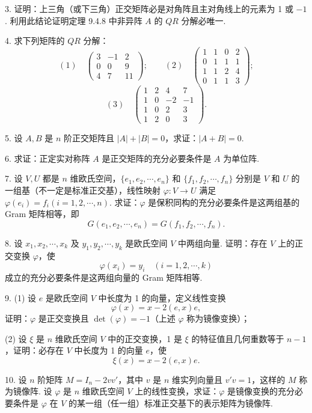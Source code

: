 \documentclass[UTF8, 12pt, fontset=fandol, oneside]{ctexart}
\begin{document}
3. 证明：上三角（或下三角）正交矩阵必是对角阵且主对角线上的元素为 1 或 $-1$. 利用此结论证明定理 9.4.8 中非异阵 $A$ 的 $QR$ 分解必唯一.

4. 求下列矩阵的 $QR$ 分解：
\[
  (1)\quad
  \left(\begin{array}{ccc}
    3 & -1 & 2\\
    0 & 0 & 9\\
    4 & 7 & 11
  \end{array}\right);
  \qquad
  (2)\quad
  \left(\begin{array}{cccc}
    1 & 1 & 0 & 2\\
    0 & 1 & 1 & 1\\
    1 & 1 & 2 & 4\\
    0 & 1 & 1 & 3
  \end{array}\right);
\]
\[
  (3)\quad
  \left(\begin{array}{cccc}
    1 & 2 & 4 & 7\\
    1 & 0 & -2 & -1\\
    1 & 0 & 2 & 3\\
    1 & 2 & 0 & 3
  \end{array}\right).
\]

5. 设 $A,B$ 是 $n$ 阶正交矩阵且 $|A|+|B|=0$，求证：$|A+B|=0$.

6. 求证：正定实对称阵 $A$ 是正交矩阵的充分必要条件是 $A$ 为单位阵.

7. 设 $V,U$ 都是 $n$ 维欧氏空间，$\{e_1,e_2,\cdots,e_n\}$ 和 $\{f_1,f_2,\cdots,f_n\}$ 分别是 $V$ 和 $U$ 的一组基（不一定是标准正交基），线性映射 $\varphi:V\to U$ 满足 $\varphi(e_i)=f_i(i=1,2,\cdots,n)$. 求证：$\varphi$ 是保积同构的充分必要条件是这两组基的 Gram 矩阵相等，即
\[
  G(e_1,e_2,\cdots,e_n)=G(f_1,f_2,\cdots,f_n).
\]

8. 设 $x_1,x_2,\cdots,x_k$ 及 $y_1,y_2,\cdots,y_k$ 是欧氏空间 $V$ 中两组向量. 证明：存在 $V$ 上的正交变换 $\varphi$，使
\[
  \varphi(x_i)=y_i\quad(i=1,2,\cdots,k)
\]
成立的充分必要条件是这两组向量的 Gram 矩阵相等.

9. (1) 设 $e$ 是欧氏空间 $V$ 中长度为 1 的向量，定义线性变换
\[
  \varphi(x)=x-2(e,x)e,
\]
证明：$\varphi$ 是正交变换且 $\det(\varphi)=-1$（上述 $\varphi$ 称为镜像变换）；

(2) 设 $\xi$ 是 $n$ 维欧氏空间 $V$ 中的正交变换，1 是 $\xi$ 的特征值且几何重数等于 $n-1$，证明：必存在 $V$ 中长度为 1 的向量 $e$，使
\[
  \xi(x)=x-2(e,x)e.
\]

10. 设 $n$ 阶矩阵 $M=I_n-2vv'$，其中 $v$ 是 $n$ 维实列向量且 $v'v=1$，这样的 $M$ 称为镜像阵. 设 $\varphi$ 是 $n$ 维欧氏空间 $V$ 上的线性变换，求证：$\varphi$ 是镜像变换的充分必要条件是 $\varphi$ 在 $V$ 的某一组（任一组）标准正交基下的表示矩阵为镜像阵.
\end{document}
